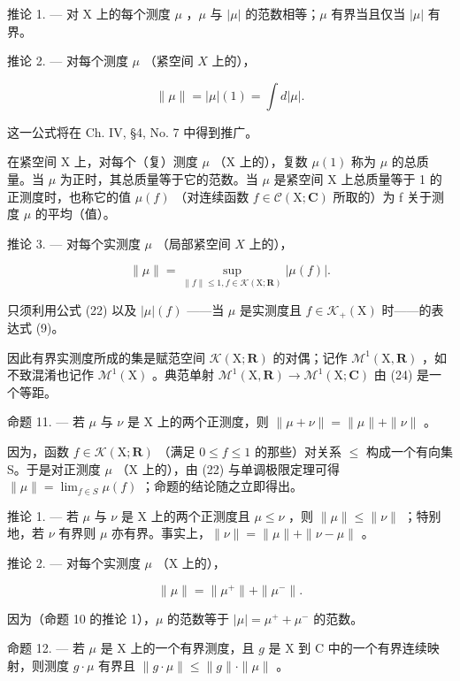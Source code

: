推论 1. --- 对 X 上的每个测度 \(\mu\) ，\(\mu\) 与 \(|\mu|\) 的范数相等；\(\mu\) 有界当且仅当 \(|\mu|\) 有界。

推论 2. --- 对每个测度 \(\mu\) （紧空间 \(X\) 上的），

\[
\| \mu \| = | \mu | (1) = \int d | \mu |.\tag{23}
\]

这一公式将在 Ch. IV, §4, No. 7 中得到推广。

在紧空间 X 上，对每个（复）测度 \(\mu\) （X 上的），复数 \(\mu(1)\) 称为 \(\mu\) 的总质量。当 \(\mu\) 为正时，其总质量等于它的范数。当 \(\mu\) 是紧空间 X 上总质量等于 1 的正测度时，也称它的值 \(\mu(f)\) （对连续函数 \(f \in \mathcal{C}(\mathrm{X};\mathbf{C})\) 所取的）为 f 关于测度 \(\mu\) 的平均（值）。

推论 3. --- 对每个实测度 \(\mu\) （局部紧空间 \(X\) 上的），

\[
\| \mu \| = \sup _ {\| f \| \leqslant 1, f \in \mathcal{K} (\mathrm{X}; \mathbf {R})} | \mu (f) |.\tag{24}
\]

只须利用公式 (22) 以及 \(|\mu|(f)\) ——当 \(\mu\) 是实测度且 \(f \in \mathcal{K}_{+}(\mathrm{X})\) 时——的表达式 (9)。

因此有界实测度所成的集是赋范空间 \(\mathcal{K}(\mathrm{X};\mathbf{R})\) 的对偶；记作 \(\mathcal{M}^{1}(\mathrm{X},\mathbf{R})\) ，如不致混淆也记作 \(\mathcal{M}^{1}(\mathrm{X})\) 。典范单射 \(\mathcal{M}^{1}(\mathrm{X},\mathbf{R})\to\mathcal{M}^{1}(\mathrm{X};\mathbf{C})\) 由 (24) 是一个等距。

命题 11. --- 若 \(\mu\) 与 \(\nu\) 是 X 上的两个正测度，则 \(\| \mu + \nu \| = \| \mu \| + \| \nu \|\) 。

因为，函数 \(f \in \mathcal{K}(\mathrm{X}; \mathbf{R})\) （满足 \(0 \leqslant f \leqslant 1\) 的那些）对关系 \(\leqslant\) 构成一个有向集 S。于是对正测度 \(\mu\) （X 上的），由 (22) 与单调极限定理可得 \(\| \mu \| = \lim_{f \in S} \mu(f)\) ；命题的结论随之立即得出。

推论 1. --- 若 \(\mu\) 与 \(\nu\) 是 X 上的两个正测度且 \(\mu \leqslant \nu\) ，则 \(\| \mu \| \leqslant \| \nu \|\) ；特别地，若 \(\nu\) 有界则 \(\mu\) 亦有界。事实上，\(\| \nu \| = \| \mu \| + \| \nu - \mu \|\) 。

推论 2. --- 对每个实测度 \(\mu\) （X 上的），

\[
\| \mu \| = \| \mu^ {+} \| + \| \mu^ {-} \|.
\]

因为（命题 10 的推论 1），\(\mu\) 的范数等于 \(|\mu| = \mu^{+} + \mu^{-}\) 的范数。

命题 12. --- 若 \(\mu\) 是 X 上的一个有界测度，且 \(g\) 是 X 到 C 中的一个有界连续映射，则测度 \(g \cdot \mu\) 有界且 \(\| g \cdot \mu \| \leqslant \| g \| \cdot \| \mu \|\) 。

